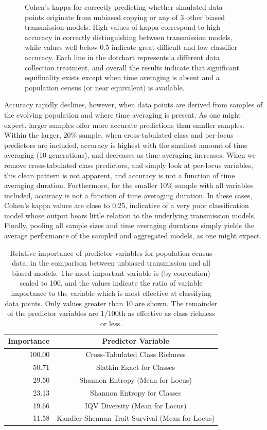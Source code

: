 \begin{figure}[h]
\caption{Cohen's kappa for correctly predicting whether simulated data points originate from unbiased copying or any of 3 other biased transmission models.  High values of kappa correspond to high accuracy in correctly distinguishing between transmission models, while values well below 0.5 indicate great difficult and low classifier accuracy.  Each line in the dotchart represents a different data collection treatment, and overall the results indicate that significant equifinality exists except when time averaging is absent and a population census (or near equivalent) is available.}
\label{fig4}
\end{figure}

Accuracy rapidly declines, however, when data points are derived from samples of the evolving population and where time averaging is present.  As one might expect, larger samples offer more accurate predictions than smaller samples.  Within the larger, 20\% sample, when cross-tabulated class and per-locus predictors are included, accuracy is highest with the smallest amount of time averaging (10 generations), and decreases as time averaging increases.  When we remove cross-tabulated class predictors, and simply look at per-locus variables, this clean pattern is not apparent, and accuracy is not a function of time averaging duration.  Furthermore, for the smaller 10\% sample with all variables included, accuracy is not a function of time averaging duration.  In these cases, Cohen's kappa values are close to 0.25, indicative of a very poor classification model whose output bears little relation to the underlying transmission models.  Finally, pooling all sample sizes and time averaging durations simply yields the average performance of the sampled and aggregated models, as one might expect.  

\begin{table}[ht]
\begin{tabular}{rc}
  \hline
Importance & Predictor Variable \\
  \hline
100.00 & Cross-Tabulated Class Richness \\
  50.71 & Slatkin Exact for Classes \\
  29.50 & Shannon Entropy (Mean for Locus) \\
  23.13 & Shannon Entropy for Classes \\
  19.66 & IQV Diversity (Mean for Locus) \\
  11.58 & Kandler-Shennan Trait Survival (Mean for Locus) \\
   \hline
\end{tabular}
\caption{Relative importance of predictor variables for population census data, in the comparison between unbiased transmission and all biased models.  The most important variable is (by convention) scaled to 100, and the values indicate the ratio of variable importance to the variable which is most effective at classifying data points.  Only values greater than 10 are shown. The remainder of the predictor variables are 1/100th as effective as class richness or less.}
\label{tab:varimp-popcensus}
\end{table}

